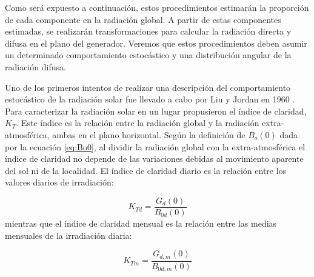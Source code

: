 Como será expuesto a continuación, estos procedimientos estimarán
la proporción de cada componente en la radiación global. A partir
de estas componentes estimadas, se realizarán transformaciones para
calcular la radiación directa y difusa en el plano del generador.
Veremos que estos procedimientos deben asumir un determinado comportamiento
estocástico y una distribución angular de la radiación difusa. 

Uno de los primeros intentos de realizar una descripción del comportamiento
estocástico de la radiación solar fue llevado a cabo por Liu y Jordan
en 1960 \cite{Liu.Jordan1960}. Para caracterizar la radiación solar
en un lugar propusieron el índice de claridad, $K_{T}$.
Este índice es la relación entre la radiación global y la radiación
extra-atmosférica, ambas en el plano horizontal. Según la definición
de $B_{o}(0)$ dada por la ecuación \ref{eq:Bo0}, al dividir la radiación
global con la extra-atmosférica el índice de claridad no depende de
las variaciones debidas al movimiento aparente del sol ni de la localidad.
El índice de claridad diario es la relación entre los valores diarios
de irradiación: 

\begin{equation}
K_{Td}=\frac{G_{d}(0)}{B_{0d}(0)}\end{equation}
mientras que
el índice de claridad mensual es la relación entre las medias mensuales
de la irradiación diaria:

\begin{equation}
K_{Tm}=\frac{G_{d,m}(0)}{B_{0d,m}(0)}\end{equation}

